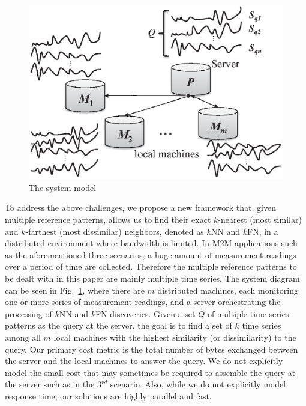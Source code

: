 \begin{figure}[tbp]
\centering
\includegraphics[width=0.6\linewidth]{system-model.eps}
\vspace{-0.1in}
\caption{The system model}
\label{fig:system-model}
\vspace{-0.2in}
\end{figure}

To address the above challenges, we propose a new framework that,
given multiple reference patterns, allows us to find their exact $k$-nearest (most similar) and $k$-farthest (most dissimilar) neighbors, denoted as $k$NN and $k$FN, in a distributed environment where bandwidth is limited. In M2M applications such as the aforementioned three scenarios, a huge amount of measurement readings over a period of time are collected. Therefore the multiple reference patterns to be dealt with in this paper are mainly multiple time series. The system diagram can be seen in Fig.~\ref{fig:system-model}, where there are $m$ distributed machines, each monitoring one or more series of measurement readings, and a server orchestrating
the processing of $k$NN and $k$FN discoveries. Given a set $Q$ of multiple time series patterns as the query at the server, the goal is to find a set of $k$ time series among all $m$ local machines with the highest similarity (or
dissimilarity) to the query.  Our primary cost metric is the total
number of bytes exchanged between the server and the local machines to
answer the query. We do not explicitly model the small cost that may
sometimes be required to assemble the query at the server such as in the 3$^{rd}$
scenario.  Also, while we do not explicitly model response time, our
solutions are highly parallel and fast.

